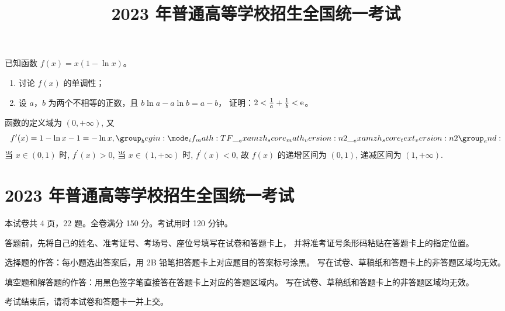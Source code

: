 \documentclass{exam-zh}
\begin{document}
\begin{problem}[points = 12]
  已知函数 $f(x) = x (1 - \ln x)$。
  \begin{enumerate}
    \item 讨论 $f(x)$ 的单调性；
    \item 设 $a$，$b$ 为两个不相等的正数，且 $b \ln a - a \ln b = a - b$，
      证明：$2 < \frac{1}{a} + \frac{1}{b} < \mathrm{ e }$。
  \end{enumerate}
\end{problem}

\begin{solution}
  函数的定义域为 $(0, +\infty)$,
  又 \[f^{\prime}(x) = 1 - \ln x-1 = -\ln x, \score{2}\]
  当 $x \in(0, 1)$ 时, $f^{\prime}(x) > 0$, 当 $x \in(1, +\infty)$ 时, $f^{\prime}(x) < 0$,
  故 $f(x)$ 的递增区间为 $(0,1)$, 递减区间为 $(1, +\infty)$.
\end{solution}



\chapter{2023 年普通高等学校招生全国统一考试}


\secret

\title{2023 年普通高等学校招生全国统一考试}

\subject{数学（理科）}

\maketitle

本试卷共 4 页，22 题。全卷满分 150 分。考试用时 120 分钟。

\goodluck

\begin{notice}
  \item 答题前，先将自己的姓名、准考证号、考场号、座位号填写在试卷和答题卡上，
    并将准考证号条形码粘贴在答题卡上的指定位置。
  \item 选择题的作答：每小题选出答案后，用 2B 铅笔把答题卡上对应题目的答案标号涂黑。
    写在试卷、草稿纸和答题卡上的非答题区域均无效。
  \item 填空题和解答题的作答：用黑色签字笔直接答在答题卡上对应的答题区域内。
    写在试卷、草稿纸和答题卡上的非答题区域均无效。
  \item 考试结束后，请将本试卷和答题卡一并上交。
\end{notice}
\end{document}
